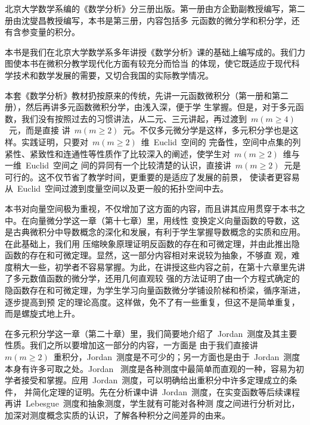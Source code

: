 
\begin{preface}
北京大学数学系编的《数学分析》分三册出版。第一册由方企勤副教授编写，第二册由沈燮昌教授编写，本书是第三册，内容包括多
元函数的微分学和积分学，还有含参变量的积分。

本书是我们在北京大学数学系多年讲授《数学分析》课的基础上编写成的。我们力图使本书在微积分教学现代化方面有较充分而恰当
的体现，使它既适应于现代科学技术和数学发展的需要，又切合我国的实际教学情况。

本套《数学分析》教材扔按原来的传统，先讲一元函数微积分（第一册和第二册），然后再讲多元函数微积分学，由浅入深，便于学
生掌握。但是，对于多元函数，我们没有按照过去的习惯讲法，从二元、三元讲起，再过渡到~$m(m\geq 4)$~元，而是直接
讲~$m(m\geq 2)$~元。不仅多元微分学是这样，多元积分学也是这样。实践证明，只要对~$m(m\geq 2)$~维~Euclid~空间的
完备性，空间中点集的列紧性、紧致性和连通性等性质作了比较深入的阐述，使学生对~$m(m\geq 2)$~维与一维~Euclid~空间之
间的异同有一个比较清楚的认识，直接讲~$m(m\geq 2)$~元是可行的。这不仅节省了教学时间，更重要的是适应了发展的前景，%
使读者更容易从~Euclid~空间过渡到度量空间以及更一般的拓扑空间中去。

本书对向量空间极为重视，不仅增加了这方面的内容，而且讲其应用贯穿于本书之中。在向量微分学这一章（第十七章）里，用线性
变换定义向量函数的导数，这是古典微积分中导数概念的深化和发展，有利于学生掌握导数概念的实质和应用。在此基础上，我们用
压缩映象原理证明反函数的存在和可微定理，并由此推出隐函数的存在和可微定理。显然，这一部分内容相对来说较为抽象，不够直
观，难度稍大一些，初学者不容易掌握。为此，在讲授这些内容之前，在第十六章里先讲了多元数值函数的微分学，还用几何直观较
强的方法证明了由一个方程式确定的隐函数存在和可微定理，为学生学习向量函数微分学铺设阶梯和桥梁，循序渐进，逐步提高到预
定的理论高度。这样做，免不了有一些重复，但这不是简单重复，而是螺旋式地上升。

在多元积分学这一章（第二十章）里，我们简要地介绍了~Jordan~测度及其主要性质。我们之所以要增加这一部分的内容，一方面是
由于我们直接讲~$m(m\geq 2)$~重积分，Jordan~测度是不可少的；另一方面也是由于~Jordan~测度本身有许多可取之处。Jordan~
测度是各种测度中最简单而直观的一种，容易为初学者接受和掌握。应用~Jordan~测度，可以明确给出重积分中许多定理成立的条件，%
并简化定理的证明。先在分析课中讲~Jordan~测度，在实变函数等后续课程再讲~Lebesgue~测度和抽象测度，学生就有可能对各种测
度之间进行分析对比，加深对测度概念实质的认识，了解各种积分之间差异的由来。


\end{preface}
